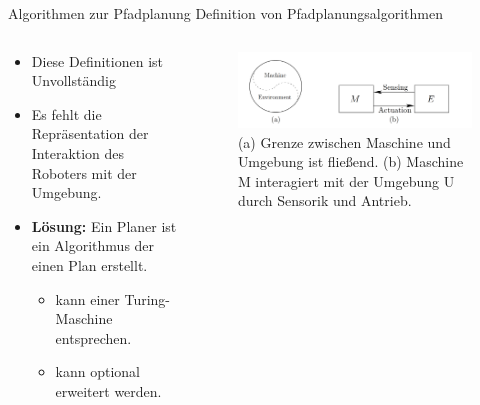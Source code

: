 \documentclass[t,aspectratio=169,dvipsnames]{beamer}
\begin{document}
\begin{frame}{Algorithmen zur Pfadplanung} {Definition von Pfadplanungsalgorithmen}
	\begin{columns}
		\begin{column}[T]{0.5\textwidth}
	\begin{itemize}[<+->]
		\item Diese Definitionen ist Unvollständig
		\item Es fehlt die Repräsentation der Interaktion des Roboters mit der Umgebung.
		\item \textbf{Lösung:} Ein Planer ist ein Algorithmus der einen Plan erstellt.
		\begin{itemize}
			\item kann einer Turing-Maschine entsprechen.
			\item kann optional erweitert werden.
		\end{itemize}	
	\end{itemize}
	\end{column}
		\begin{column}[T]{0.5\textwidth}
			\begin{figure}[<+->]
				\includegraphics[width=6.5cm]{images/img224.png}
				\caption{(a) Grenze zwischen Maschine und Umgebung ist fließend.\newline
						(b) Maschine M interagiert mit der Umgebung U durch Sensorik und Antrieb. } 
			\end{figure}
		\end{column}
	\end{columns}	
\end{frame}
\end{document}
